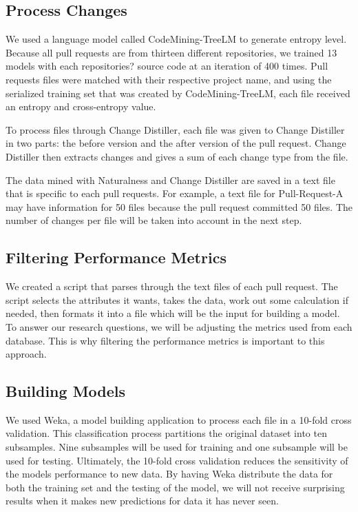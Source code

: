 \documentclass[10pt, conference]{IEEEtran}
\begin{document}
\subsection{Process Changes}
We used a language model called CodeMining-TreeLM to generate entropy level. Because all pull requests are from thirteen different repositories, we trained 13 models with each repositories? source code at an iteration of 400 times. Pull request\textquotesingle s files were matched with their respective project name, and using the serialized training set that was created by CodeMining-TreeLM, each file received an entropy and cross-entropy value.

To process files through Change Distiller, each file was given to Change Distiller in two parts: the before version and the after version of the pull request. Change Distiller then extracts changes and gives a sum of each change type from the file. 

The data mined with Naturalness and Change Distiller are saved in a text file that is specific to each pull requests. For example, a text file for Pull-Request-A may have information for 50 files because the pull request committed 50 files. The number of changes per file will be taken into account in the next step.

\subsection{Filtering Performance Metrics}
We created a script that parses through the text files of each pull request. The script selects the attributes it wants, takes the data, work out some calculation if needed, then formats it into a file which will be the input for building a model. To answer our research questions, we will be adjusting the metrics used from each database. This is why filtering the performance metrics is important to this approach.

\subsection{Building Models}
We used Weka, a model building application to process each file in a 10-fold cross validation. This classification process partitions the original dataset into ten subsamples. Nine subsamples will be used for training and one subsample will be used for testing. Ultimately, the 10-fold cross validation reduces the sensitivity of the model\textquotesingle s performance to new data. By having Weka distribute the data for both the training set and the testing of the model, we will not receive surprising results when it makes new predictions for data it has never seen.
\end{document}
